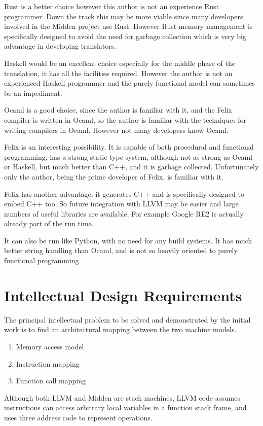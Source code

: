 \documentclass{article}
\begin{document}
Rust is a better choice however this author is not an experience Rust
programmer. Down the track this may be more viable since many developers
involved in the Midden project use Rust. However Rust memory management
is specifically designed to avoid the need for garbage collection which
is very big advantage in developing translators.

Haskell would be an excellent choice especially for the middle phase
of the translation, it has all the facilities required. However the
author is not an experienced Haskell programmer and the purely 
functional model can sometimes be an impediment.

Ocaml is a good choice, since the author is familiar with it,
and the Felix compiler is written in Ocaml, so the author is familiar
with the techniques for writing compilers in Ocaml. However not many
developers know Ocaml.

Felix is an interesting possibility. It is capable of both procedural
and functional programming, has a strong static type system, although
not as strong as Ocaml or Haskell, but much better than C++, and it
is garbage collected. Unfortunately only the author, being the prime
developer of Felix, is familiar with it.

Felix has another advantage: it generates C++ and is specifically designed
to embed C++ too. So future integration with LLVM may be easier and large
numbers of useful libraries are available. For example Google RE2 is actually
already part of the run time.

It can also be run like Python, with no need for any build systems.
It has much better string handling than Ocaml, and is not so heavily
oriented to purely functional programming.

\section{Intellectual Design Requirements}
The principal intellectual problem to be solved and demonstrated 
by the initial work is to find an architectural mapping between the two machine models.

\begin{enumerate}
\item Memory access model
\item Instruction mapping
\item Function call mapping
\end{enumerate}
 
Although both LLVM and Midden are stack machines, 
LLVM code assumes instructions
can access arbitrary local variables in a function stack frame,
and uses three address code to represent operations.
\end{document}
